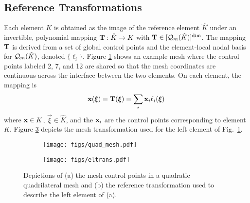 \documentclass[../doc.tex]{subfiles}
\begin{document}
\subsection{Reference Transformations}
Each element $K$ is obtained as the image of the reference element $\hat{K}$ under an invertible, polynomial mapping $\boldsymbol{\mathrm{T}} : \hat{K} \rightarrow K$ with $\boldsymbol{\mathrm{T}} \in [\mathcal{Q}_{m}(\hat{K})]^{\dim}$. 
The mapping $\boldsymbol{\mathrm{T}}$ is derived from a set of global control points and the element-local nodal basis for $\mathcal{Q}_{m}(\hat{K})$, denoted $\{\ell_i\}$. Figure \ref{fem:quadmesh} shows an example mesh where the control points labeled 2, 7, and 12 are shared so that the mesh coordinates are continuous across the interface between the two elements. 
On each element, the mapping is 
	\begin{equation}
		\boldsymbol{\mathrm{x}}(\boldsymbol{\xi}) = \boldsymbol{\mathrm{T}}(\boldsymbol{\xi}) = \sum_i \boldsymbol{\mathrm{x}}_i \ell_i(\boldsymbol{\xi}) 
	\end{equation}
where $\boldsymbol{\mathrm{x}} \in K$, $\vec{\xi}\in \hat{K}$, and the $\boldsymbol{\mathrm{x}}_i$ are the control points corresponding to element $K$. Figure \ref{fem:eltrans} depicts the mesh transformation used for the left element of Fig.~\ref{fem:quadmesh}. 
\begin{figure}
\centering
\begin{subfigure}{.4\textwidth}
	\centering
	\texttt{[image: figs/quad\_mesh.pdf]}
	\caption{}
	\label{fem:quadmesh}
\end{subfigure}
\begin{subfigure}{.59\textwidth}
	\centering
	\texttt{[image: figs/eltrans.pdf]}
	\caption{}
	\label{fem:eltrans}
\end{subfigure}
\caption{Depictions of (a) the mesh control points in a quadratic quadrilateral mesh and (b) the reference transformation used to describe the left element of (a).}
\end{figure}
\end{document}
